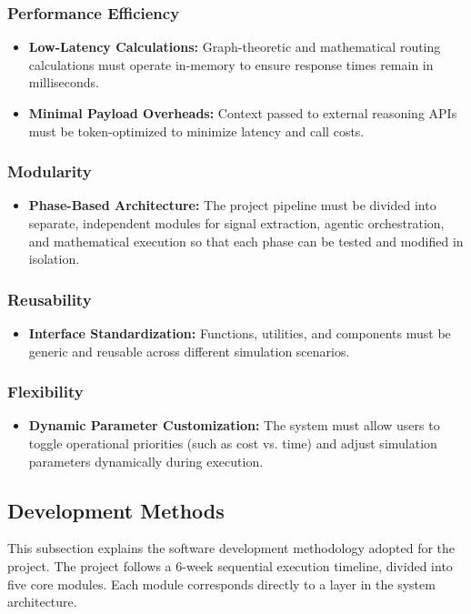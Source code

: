 \subsubsection{Performance Efficiency}
\begin{itemize}
    \item \textbf{Low-Latency Calculations:} Graph-theoretic and mathematical routing calculations must operate in-memory to ensure response times remain in milliseconds.
    \item \textbf{Minimal Payload Overheads:} Context passed to external reasoning APIs must be token-optimized to minimize latency and call costs.
\end{itemize}

\subsubsection{Modularity}
\begin{itemize}
    \item \textbf{Phase-Based Architecture:} The project pipeline must be divided into separate, independent modules for signal extraction, agentic orchestration, and mathematical execution so that each phase can be tested and modified in isolation.
\end{itemize}

\subsubsection{Reusability}
\begin{itemize}
    \item \textbf{Interface Standardization:} Functions, utilities, and components must be generic and reusable across different simulation scenarios.
\end{itemize}

\subsubsection{Flexibility}
\begin{itemize}
    \item \textbf{Dynamic Parameter Customization:} The system must allow users to toggle operational priorities (such as cost vs. time) and adjust simulation parameters dynamically during execution.
\end{itemize}
\subsection[Development Methods]{Development Methods}
This subsection explains the software development methodology adopted for the project. The project follows a 6-week sequential execution timeline, divided into five core modules. Each module corresponds directly to a layer in the system architecture.

